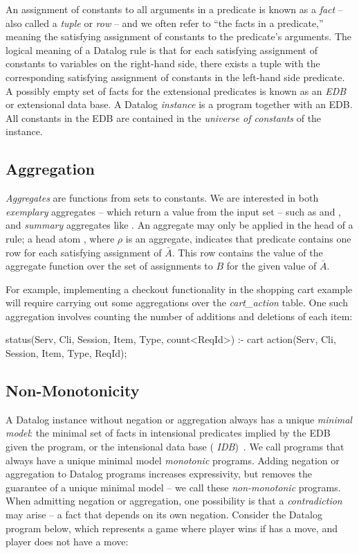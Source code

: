 An assignment of constants to all arguments in a predicate is known as a {\em
fact} -- also called a {\em tuple} or {\em row} -- and we often refer to ``the
facts in a predicate,'' meaning the satisfying assignment of constants to the
predicate's arguments.  The logical meaning of a Datalog rule is that for each
satisfying assignment of constants to variables on the right-hand side, there
exists a tuple with the corresponding satisfying assignment of constants in the
left-hand side predicate.
A possibly empty set of facts for the extensional predicates is known as an
{\em EDB} or extensional data base.  A Datalog {\em instance} is a program
together with an EDB.  All constants in the EDB are contained in the {\em
universe of constants} of the instance.

\subsection{Aggregation}

{\em Aggregates} are functions from sets to constants.
We are interested in both {\em exemplary} aggregates -- which return a value
from the input set -- such as  and , and {\em summary}
aggregates like .  An aggregate may only be applied in the head
of a rule; a head atom , where $\rho$ is an 
aggregate, indicates that predicate  contains one row for each 
satisfying assignment of $\bar{A}$.  This row contains the value of the 
aggregate function over the set of assignments to $B$ for the given value of 
$\bar{A}$.

For example, implementing a checkout functionality in the shopping cart example
will require carrying out some aggregations over the {\em cart\_action} table.
One such aggregation involves counting the number of additions and deletions 
of each item:

\begin{Dedalus}
status(Serv, Cli, Session, Item, Type, count<ReqId>) :- 
  cart action(Serv, Cli, Session, Item, Type, ReqId);
\end{Dedalus}

\subsection{Non-Monotonicity}

A Datalog instance without negation or aggregation always has a unique {\em
minimal model}: the minimal set of facts in intensional predicates implied by
the EDB given the program, or the intensional data base ({\em
IDB})~\cite{ullmanbook}.  We call programs that always have a unique minimal
model {\em monotonic} programs.  Adding negation or aggregation to Datalog
programs increases expressivity, but removes the guarantee of a
unique minimal model -- we call these {\em non-monotonic} programs.  When
admitting negation or aggregation, one possibility is that a {\em
contradiction} may arise -- a fact that depends on its own negation.  Consider
the Datalog program below, which represents a game where player 
wins if has a move, and player  does not have a move:

